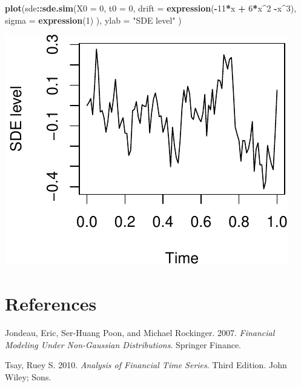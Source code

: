 \documentclass[11pt,]{article}
\newenvironment{Shaded}{\begin{snugshade}}{\end{snugshade}}
\newcommand{\KeywordTok}[1]{\textcolor[rgb]{0.13,0.29,0.53}{\textbf{#1}}}
\newcommand{\DataTypeTok}[1]{\textcolor[rgb]{0.13,0.29,0.53}{#1}}
\newcommand{\DecValTok}[1]{\textcolor[rgb]{0.00,0.00,0.81}{#1}}
\newcommand{\StringTok}[1]{\textcolor[rgb]{0.31,0.60,0.02}{#1}}
\newcommand{\OperatorTok}[1]{\textcolor[rgb]{0.81,0.36,0.00}{\textbf{#1}}}
\newcommand{\NormalTok}[1]{#1}
\begin{document}
\begin{Shaded}
\begin{Highlighting}[]
\KeywordTok{plot}\NormalTok{(sde}\OperatorTok{::}\KeywordTok{sde.sim}\NormalTok{(}\DataTypeTok{X0 =} \DecValTok{0}\NormalTok{, }
                  \DataTypeTok{t0 =} \DecValTok{0}\NormalTok{, }
                  \DataTypeTok{drift =} \KeywordTok{expression}\NormalTok{(}\OperatorTok{-}\DecValTok{11}\OperatorTok{*}\NormalTok{x }\OperatorTok{+}\StringTok{ }\DecValTok{6}\OperatorTok{*}\NormalTok{x}\OperatorTok{^}\DecValTok{2} \OperatorTok{-}\NormalTok{x}\OperatorTok{^}\DecValTok{3}\NormalTok{), }
                  \DataTypeTok{sigma =} \KeywordTok{expression}\NormalTok{(}\DecValTok{1}\NormalTok{)}
\NormalTok{                  ),}
     \DataTypeTok{ylab =} \StringTok{"SDE level"}
\NormalTok{     )}
\end{Highlighting}
\end{Shaded}

\begin{center}\includegraphics{FMC_T4_PhD_Wiener_Process_files/figure-latex/sde_ex_2-1} \end{center}

\section*{References}\label{references}

\hypertarget{refs}{}
\hypertarget{ref-Jondeau_Poon_Rockinger:2007}{}
Jondeau, Eric, Ser-Huang Poon, and Michael Rockinger. 2007.
\emph{Financial Modeling Under Non-Gaussian Distributions}. Springer
Finance.

\hypertarget{ref-Tsay:2010}{}
Tsay, Ruey S. 2010. \emph{Analysis of Financial Time Series}. Third
Edition. John Wiley; Sons.
\end{document}
